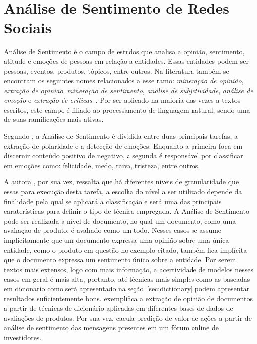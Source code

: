 \chapter{Análise de Sentimento de Redes Sociais}
\label{chapter:sentiment}

Análise de Sentimento é o campo de estudos que analisa a opinião, sentimento,
atitude e emoções de pessoas em relação a entidades.
Essas entidades podem ser pessoas, eventos, produtos, tópicos, entre outros.
Na literatura também se encontram os seguintes nomes relacionados a esse ramo:
\textit{mineração de opinião}, \textit{extração de opinião},
\textit{mineração de sentimento}, \textit{análise de subjetividade},
\textit{análise de emoção} e \textit{extração de críticas}~\cite{liu15}.
Por ser aplicado na maioria das vezes a textos escritos, este campo é filiado
ao processamento de linguagem natural, sendo uma de suas ramificações mais
ativas.

Segundo \citet{cambria16}, a Análise de Sentimento é dividida entre duas
principais tarefas, a extração de polaridade e a detecção de emoções.
Enquanto a primeira foca em discernir conteúdo positivo de negativo, a segunda é
responsável por classificar em emoções como: felicidade, medo, raiva, tristeza,
entre outros.

A autora \citet{liu15}, por sua vez, ressalta que há diferentes níveis de
granularidade que essas para execução desta tarefa, a escolha do nível a ser
utilizado depende da finalidade pela qual se aplicará a classificação e será uma
das principais caraterísticas para definir o tipo de técnica empregada.
A Análise de Sentimento pode ser realizada a nível de documento, no qual um
documento, como uma avaliação de produto, é avaliado como um todo.
Nesses casos se assume implicitamente que um documento expressa uma opinião
sobre uma única entidade, como o produto em questão no exemplo citado, também
fica implícita que o documento expressa um sentimento único sobre a entidade.
Por serem textos mais extensos, logo com mais informação, a acertividade de
modelos nesses casos em geral é mais alta, portanto, até técnicas mais simples
como as baseadas em dicionario como será apresentado na seção~\ref{sec:dictionary}
podem apresentar resultados suficientemente bons.
\citet{taboada11} exemplifica a extração de opinião de documentos a partir de
técnicas de dicionário aplicadas em diferentes bases de dados de avaliações de
produtos.
Por sua vez, \citet{das07} cacula predição de valor de ações a partir de
análise de sentimento das mensagens presentes em um fórum online de investidores.

